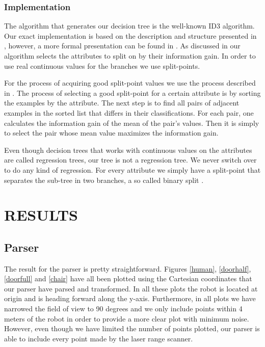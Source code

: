 \documentclass[a4paper, 10pt, conference]{ieeeconf}      %
\begin{document}
\subsubsection{Implementation}
The algorithm that generates our decision tree is the well-known ID3 algorithm. Our exact implementation is based on the description and structure presented in \cite{aima}, however, a more formal presentation can be found in \cite{ml3}. As discussed in \cite{aima} our algorithm selects the attributes to split on by their information gain. In order to use real continuous values for the branches we use split-points.

For the process of acquiring good split-point values we use the process described in \cite{ml3}. The process of selecting a good split-point for a certain attribute is by sorting the examples by the attribute. The next step is to find all pairs of adjacent examples in the sorted list that differs in their classifications. For each pair, one calculates the information gain of the mean of the pair's values. Then it is simply to select the pair whose mean value maximizes the information gain.

Even though decision trees that works with continuous values on the attributes are called regression trees, our tree is not a regression tree. We never switch over to do any kind of regression. For every attribute we simply have a split-point that separates the sub-tree in two branches, a so called binary split \cite{aima}.

\section{RESULTS}


\subsection{Parser}
The result for the parser is pretty straightforward. Figures \ref{human}, \ref{doorhalf}, \ref{doorfull} and \ref{chair} have all been plotted using the Cartesian coordinates that our parser have parsed and transformed. In all these plots the robot is located at origin and is heading forward along the y-axis. Furthermore, in all plots we have narrowed the field of view to 90 degrees and we only include points within 4 meters of the robot in order to provide a more clear plot with minimum noise. However, even though we have limited the number of points plotted, our parser is able to include every point made by the laser range scanner.
\end{document}
